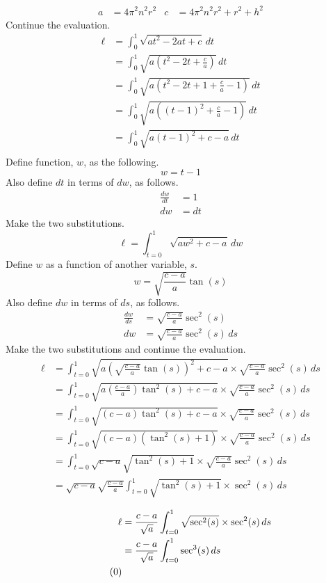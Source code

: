 \documentclass{article}
\begin{document}
\begin{align*}
    a &= 4\pi^2n^2r^2&
    c &= 4\pi^2n^2r^2+r^2+h^2
\end{align*}
Continue the evaluation.
\begin{align*}
    \ell &= \int_0^1\sqrt{at^2-2at+c}\, dt\\
    &= \int_0^1\sqrt{a(t^2-2t+\frac{c}{a})}\, dt\\
    &= \int_0^1\sqrt{a(t^2-2t+1+\frac{c}{a}-1)}\, dt\\
    &= \int_0^1\sqrt{a((t-1)^2+\frac{c}{a}-1)}\, dt\\
    &= \int_0^1\sqrt{a(t-1)^2+c-a}\, dt\\
\end{align*}
Define function, $w$, as the following.
\begin{equation}\label{eqn:w}
    w=t-1
\end{equation}
Also define $dt$ in terms of $dw$, as follows.
\begin{align*}
    \frac{dw}{dt} &= 1\\
    dw &= dt
\end{align*}
Make the two substitutions.
\begin{equation*}
    \ell = \int_{t=0}^1\sqrt{aw^2+c-a}\, dw
\end{equation*}
Define $w$ as a function of another variable, $s$.
\begin{equation*}
    w=\sqrt{\frac{c-a}{a}}\tan(s)
\end{equation*}
Also define $dw$ in terms of $ds$, as follows.
\begin{align*}
    \frac{dw}{ds} &= \sqrt{\frac{c-a}{a}}\sec^2(s)\\
    dw &= \sqrt{\frac{c-a}{a}}\sec^2(s)\, ds
\end{align*}
Make the two substitutions and continue the evaluation.
\begin{align*}
    \ell &= \int_{t=0}^1\sqrt{a\left(\sqrt{\frac{c-a}{a}}\tan(s)\right)^2+c-a}\times\sqrt{\frac{c-a}{a}}\sec^2(s)\, ds\\
    &= \int_{t=0}^1\sqrt{a\left(\frac{c-a}{a}\right)\tan^2(s)+c-a}\times\sqrt{\frac{c-a}{a}}\sec^2(s)\, ds\\
    &= \int_{t=0}^1\sqrt{(c-a)\tan^2(s)+c-a}\times\sqrt{\frac{c-a}{a}}\sec^2(s)\, ds\\
    &= \int_{t=0}^1\sqrt{(c-a)(\tan^2(s)+1)}\times\sqrt{\frac{c-a}{a}}\sec^2(s)\, ds\\
    &= \int_{t=0}^1\sqrt{c-a}\sqrt{\tan^2(s)+1}\times\sqrt{\frac{c-a}{a}}\sec^2(s)\, ds\\
    &= \sqrt{c-a}\sqrt{\frac{c-a}{a}}\int_{t=0}^1\sqrt{\tan^2(s)+1}\times\sec^2(s)\, ds\\
\end{align*}
\begin{align*}
    \ell &= \frac{c-a}{\sqrt{a}}\int_{t=0}^1\sqrt{\sec^2(s)}\times\sec^2(s)\, ds\\
    &= \frac{c-a}{\sqrt{a}}\int_{t=0}^1\sec^3(s)\, ds\\\tag{\theequation}\label{eqn:break}
    \stepcounter{equation}
\end{align*}
\end{document}

